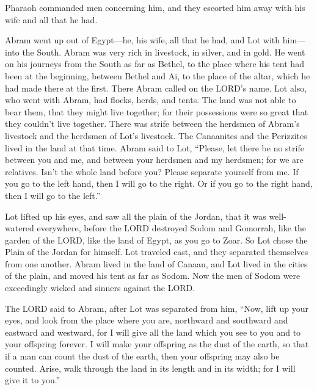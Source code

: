 \myverse{}Pharaoh commanded men concerning him, and they escorted him away with his wife and all that he had.

\mychapter{}
\myverse*{}Abram went up out of Egypt—he, his wife, all that he had, and Lot with him—into the South.  \myverse{}Abram was very rich in livestock, in silver, and in gold.  \myverse{}He went on his journeys from the South as far as Bethel, to the place where his tent had been at the beginning, between Bethel and Ai,  \myverse{}to the place of the altar, which he had made there at the first. There Abram called on the LORD’s name.  \myverse{}Lot also, who went with Abram, had flocks, herds, and tents.  \myverse{}The land was not able to bear them, that they might live together; for their possessions were so great that they couldn’t live together.  \myverse{}There was strife between the herdsmen of Abram’s livestock and the herdsmen of Lot’s livestock. The Canaanites and the Perizzites lived in the land at that time.  \myverse{}Abram said to Lot, “Please, let there be no strife between you and me, and between your herdsmen and my herdsmen; for we are relatives.  \myverse{}Isn’t the whole land before you? Please separate yourself from me. If you go to the left hand, then I will go to the right. Or if you go to the right hand, then I will go to the left.”

\myverse{}Lot lifted up his eyes, and saw all the plain of the Jordan, that it was well-watered everywhere, before the LORD destroyed Sodom and Gomorrah, like the garden of the LORD, like the land of Egypt, as you go to Zoar.  \myverse{}So Lot chose the Plain of the Jordan for himself. Lot traveled east, and they separated themselves from one another.  \myverse{}Abram lived in the land of Canaan, and Lot lived in the cities of the plain, and moved his tent as far as Sodom.  \myverse{}Now the men of Sodom were exceedingly wicked and sinners against the LORD.

\myverse{}The LORD said to Abram, after Lot was separated from him, “Now, lift up your eyes, and look from the place where you are, northward and southward and eastward and westward,  \myverse{}for I will give all the land which you see to you and to your offspring forever.  \myverse{}I will make your offspring as the dust of the earth, so that if a man can count the dust of the earth, then your offspring may also be counted.  \myverse{}Arise, walk through the land in its length and in its width; for I will give it to you.”

